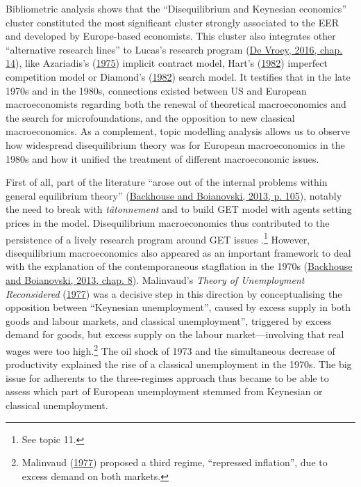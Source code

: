 \documentclass[
  12pt,
  onecolumn]{article}
\begin{document}
Bibliometric analysis shows that the ``Disequilibrium and Keynesian
economics'' cluster constituted the most significant cluster strongly
associated to the EER and developed by Europe-based economists. This
cluster also integrates other ``alternative research lines'' to Lucas's
research program (\protect\hyperlink{ref-devroey2016}{De Vroey, 2016,
chap. 14}), like Azariadis's
(\protect\hyperlink{ref-azariadis1975}{1975}) implicit contract model,
Hart's (\protect\hyperlink{ref-hart1982}{1982}) imperfect competition
model or Diamond's (\protect\hyperlink{ref-diamond1982}{1982}) search
model. It testifies that in the late 1970s and in the 1980s, connections
existed between US and European macroeconomists regarding both the
renewal of theoretical macroeconomics and the search for
microfoundations, and the opposition to new classical macroeconomics. As
a complement, topic modelling analysis allows us to observe how
widespread disequilibrium theory was for European macroeconomics in the
1980s and how it unified the treatment of different macroeconomic
issues.

First of all, part of the literature ``arose out of the internal
problems within general equilibrium theory''
(\protect\hyperlink{ref-backhouseboianovski2013}{Backhouse and
Boianovski, 2013, p. 105}), notably the need to break with
\emph{tâtonnement} and to build GET model with agents setting prices in
the model. Disequilibrium macroeconomics thus contributed to the
persistence of a lively research program around GET issues .\footnote{See
  topic 11.} However, disequilibrium macroeconomics also appeared as an
important framework to deal with the explanation of the contemporaneous
stagflation in the 1970s
(\protect\hyperlink{ref-backhouseboianovski2013}{Backhouse and
Boianovski, 2013, chap. 8}). Malinvaud's \emph{Theory of Unemployment
Reconsidered} (\protect\hyperlink{ref-malinvaud1977}{1977}) was a
decisive step in this direction by conceptualising the opposition
between ``Keynesian unemployment'', caused by excess supply in both
goods and labour markets, and classical unemployment'', triggered by
excess demand for goods, but excess supply on the labour
market---involving that real wages were too high.\footnote{Malinvaud
  (\protect\hyperlink{ref-malinvaud1977}{1977}) proposed a third regime,
  ``repressed inflation'', due to excess demand on both markets.} The
oil shock of 1973 and the simultaneous decrease of productivity
explained the rise of a classical unemployment in the 1970s. The big
issue for adherents to the three-regimes approach thus became to be able
to assess which part of European unemployment stemmed from Keynesian or
classical unemployment.
\end{document}
